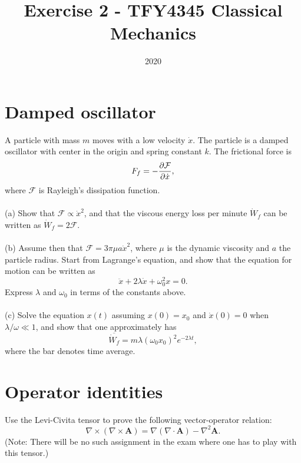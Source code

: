 \documentclass{article}
\title{Exercise 2 - TFY4345 Classical Mechanics}
\date{2020}
\begin{document}
    \maketitle
    \section{Damped oscillator}
        A particle with mass $m$ moves with a low velocity $\dot x$. The particle is a damped oscillator with center in the origin and spring constant $k$. The frictional force is 
        \begin{equation*}
            F_f = - \pdv{\mathcal{F}}{\dot x},
        \end{equation*}
        where $\mathcal{F}$ is Rayleigh's dissipation function. \\ \\
        (a) Show that $\mathcal{F} \propto \dot x^2$, and that the viscous energy loss per minute $\dot W_f$ can be written as $\dot W_f = 2 \mathcal{F}$. \\ \\
        (b) Assume then that $\mathcal{F} = 3 \pi \mu a \dot x^2$, where $\mu$ is the dynamic viscosity and $a$ the particle radius. Start from Lagrange's equation, and show that the equation for motion can be written as 
        \begin{equation*}
            \ddot x + 2 \lambda \dot x + \omega^2_0 x = 0.
        \end{equation*}
        Express $\lambda$ and $\omega_0$ in terms of the constants above. \\ \\
        (c) Solve the equation $x(t)$ assuming $x(0) = x_0$ and $\dot x(0) = 0$ when $\lambda / \omega \ll 1$, and show that one approximately has 
        \begin{equation*}
            \overline{\dot W_f} = m \lambda \left(\omega_0 x_0\right)^2 e^{-2 \lambda t},
        \end{equation*}
        where the bar denotes time average.
        

    \section{Operator identities}
        Use the Levi-Civita tensor to prove the following vector-operator relation:
        \begin{equation*}
            \nabla \times \left( \nabla \times \mathbf{A} \right) = \nabla \left(\nabla \cdot \mathbf{A}\right) - \nabla^2 \mathbf{A}.
        \end{equation*}
        (Note: There will be no such assignment in the exam where one has to play with this tensor.)
\end{document}
